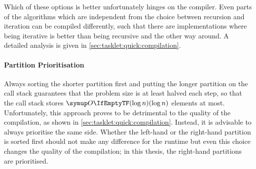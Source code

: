 Which of these options is better unfortunately hinges on the compiler.
Even parts of the algorithms which are independent from the choice between recursion and iteration can be compiled differently, such that there are implementations where being iterative is better than being recursive and the other way around.
A detailed analysis is given in \cref{sec:tasklet:quick:compilation}.


\paragraph{Partition Prioritisation}
Always sorting the shorter partition first and putting the longer partition on the call stack guarantees that the problem size is at least halved each step, so that the call stack stores \(\bigoh{\log n}\) elements at most.
Unfortunately, this approach proves to be detrimental to the quality of the compilation, as shown in \cref{sec:tasklet:quick:compilation}.
Instead, it is advisable to always prioritise the same side.
Whether the left-hand or the right-hand partition is sorted first should not make any difference for the runtime but even this choice changes the quality of the compilation;
in this thesis, the right-hand partitions are prioritised.


